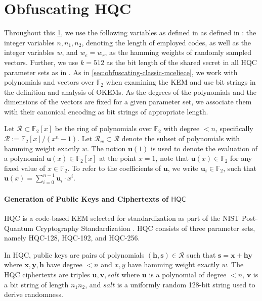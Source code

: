 \section{Obfuscating HQC} \label{sec:obfuscating-hqc}

Throughout this \cref{sec:obfuscating-hqc}, we use the following variables as defined in as defined in \cite{NISTPQC-R4:HQC22}: the integer variables $n, n_1, n_2$, denoting the length of employed codes, as well as the integer variables $w$, and $w_e = w_r$, as the hamming weights of randomly sampled vectors. Further, we use $k = 512$ as the bit length of the shared secret in all HQC parameter sets as in \cite[Fig.~3 and Table~7]{NISTPQC-R4:HQC22}.
As in \cref{sec:obfuscating-classic-mceliece}, we work with polynomials and vectors over $\mathbb F_2$ when examining the KEM and use bit strings in the definition and analysis of OKEMs. As the degrees of the polynomials and the dimensions of the vectors are fixed for a given parameter set, we associate them with their canonical encoding as bit strings of appropriate length.

Let $\mathcal R \subset \mathbb{F}_2[x]$ be the ring of polynomials over $\mathbb F_2$ with degree $<n$, specifically $\mathcal R := \mathbb{F}_2[x]/(x^n-1)$. Let $\mathcal R_w \subset \mathcal R$ denote the subset of polynomials with hamming weight exactly $w$. The notion $\mathbf u(1)$ is used to denote the evaluation of a polynomial $\mathbf u(x) \in \mathbb{F}_2[x]$ at the point $x=1$, note that $\mathbf u(x) \in \mathbb{F}_2$ for any fixed value of $x \in \mathbb{F}_2$. To refer to the coefficients of $\mathbf u$, we write $\mathbf u_i \in \mathbb{F}_2$, such that $\mathbf u(x) = \sum_{i=0}^{n-1} \mathbf u_i \cdot x^i$.

\paragraph{Generation of Public Keys and Ciphertexts of $\mathsf{HQC}$}

HQC is a code-based KEM selected for standardization as part of the NIST Post-Quantum Cryptography Standardization \cite{nist-standardization,nist-ir-8545}. HQC consists of three parameter sets, namely HQC-128, HQC-192, and HQC-256.

In HQC, public keys are pairs of polynomials $(\mathbf h, \mathbf s) \in \mathcal R$ such that $\mathbf s = \mathbf x + \mathbf h \mathbf y$ where $\mathbf x,\mathbf y,\mathbf h$ have degree $<n$ and $x,y$ have hamming weight exactly $w$.
The HQC ciphertexts are triples $\mathbf u,\mathbf v,\mathit{salt}$ where $\mathbf u$ is a polynomial of degree $<n$, $\mathbf v$ is a bit string of length $n_1n_2$, and $\mathit{salt}$ is a uniformly random 128-bit string used to derive randomness.

